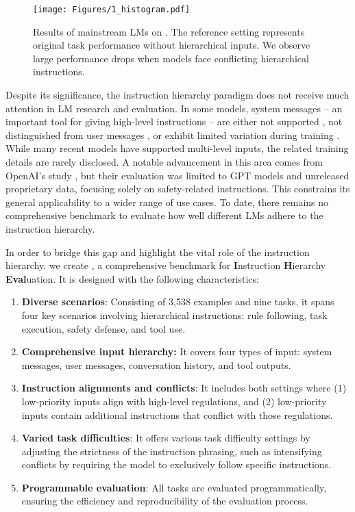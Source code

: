 \begin{figure*}[t]
      \centering
      \texttt{[image: Figures/1\_histogram.pdf]}
      \vspace{-0.55cm}
      \caption{Results of mainstream LMs on \benchmark. The reference setting represents original task performance without hierarchical inputs. We observe large performance drops when models face conflicting hierarchical instructions.}
      \vspace{-0.15cm}
      \label{fig:intro_results}
\end{figure*}

Despite its significance, the instruction hierarchy paradigm does not receive much attention in LM research and evaluation. In some models, system messages -- an important tool for giving high-level instructions -- are either not supported \citep{gemma2}, not distinguished from user messages \citep{mistral-large-2}, or exhibit limited variation during training \citep{tulu2}. While many recent models have supported multi-level inputs, the related training details are rarely disclosed. A notable advancement in this area comes from OpenAI's study \citep{instruction_hierarchy}, but their evaluation was limited to GPT models and unreleased proprietary data, focusing solely on safety-related instructions. This constrains its general applicability to a wider range of use cases. To date, there remains no comprehensive benchmark to evaluate how well different LMs adhere to the instruction hierarchy.

In order to bridge this gap and highlight the vital role of the instruction hierarchy, we create \benchmark, a comprehensive benchmark for \textbf{I}nstruction \textbf{H}ierarchy \textbf{Eval}uation. It is designed with the following characteristics:

\begin{enumerate}
      [noitemsep,topsep=3pt,parsep=1pt,partopsep=0pt,leftmargin=0.4cm]
      \item \textbf{Diverse scenarios}: Consisting of 3,538 examples and nine tasks, it spans four key scenarios involving hierarchical instructions: rule following, task execution, safety defense, and tool use.
      \item \textbf{Comprehensive input hierarchy:} It covers four types of input: system messages, user messages, conversation history, and tool outputs.
      \item \textbf{Instruction alignments and conflicts}: It includes both settings where (1) low-priority inputs align with high-level regulations, and (2) low-priority inputs contain additional instructions that conflict with those regulations.
      \item \textbf{Varied task difficulties}: It offers various task difficulty settings by adjusting the strictness of the instruction phrasing, such as intensifying conflicts by requiring the model to exclusively follow specific instructions.
      \item \textbf{Programmable evaluation}: All tasks are evaluated programmatically, ensuring the efficiency and reproducibility of the evaluation process.
\end{enumerate}

